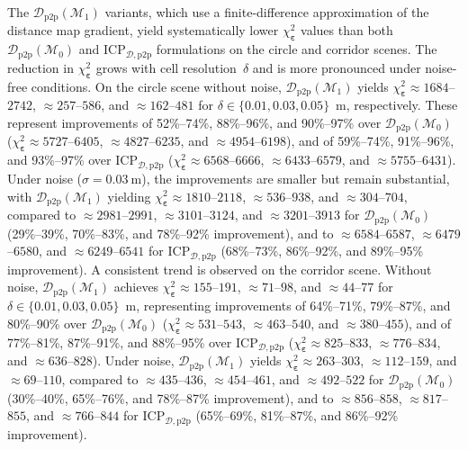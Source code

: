 The $\mathcal{D}_\mathrm{p2p}(\mathcal{M}_1)$ variants, which use a
finite-difference approximation of the distance map gradient, yield
systematically lower $\chi_{\boldsymbol{\varepsilon}}^2$ values than both
$\mathcal{D}_\mathrm{p2p}(\mathcal{M}_0)$ and
$\mathrm{ICP}_{\mathcal{D},\mathrm{p2p}}$ formulations on the circle and
corridor scenes. The reduction in $\chi_{\boldsymbol{\varepsilon}}^2$ grows
with cell resolution~$\delta$ and is more pronounced under noise-free
conditions. On the circle scene without noise,
$\mathcal{D}_\mathrm{p2p}(\mathcal{M}_1)$ yields
$\chi_{\boldsymbol{\varepsilon}}^2 \approx 1684$--$2742$,
$\approx 257$--$586$, and $\approx 162$--$481$ for
$\delta \in \{0.01, 0.03, 0.05\}$~m, respectively.
These represent improvements of 52\%--74\%, 88\%--96\%, and 90\%--97\% over
$\mathcal{D}_\mathrm{p2p}(\mathcal{M}_0)$
($\chi_{\boldsymbol{\varepsilon}}^2 \approx 5727$--$6405$,
$\approx 4827$--$6235$, and $\approx 4954$--$6198$), and of
59\%--74\%, 91\%--96\%, and 93\%--97\% over
$\mathrm{ICP}_{\mathcal{D},\mathrm{p2p}}$
($\chi_{\boldsymbol{\varepsilon}}^2 \approx 6568$--$6666$,
$\approx 6433$--$6579$, and $\approx 5755$--$6431$).
Under noise ($\sigma = \SI{0.03}{\metre}$), the improvements are smaller but
remain substantial, with
$\mathcal{D}_\mathrm{p2p}(\mathcal{M}_1)$ yielding
$\chi_{\boldsymbol{\varepsilon}}^2 \approx 1810$--$2118$,
$\approx 536$--$938$, and $\approx 304$--$704$, compared to
$\approx 2981$--$2991$, $\approx 3101$--$3124$, and $\approx 3201$--$3913$
for $\mathcal{D}_\mathrm{p2p}(\mathcal{M}_0)$
(29\%--39\%, 70\%--83\%, and 78\%--92\% improvement), and to
$\approx 6584$--$6587$, $\approx 6479$--$6580$, and $\approx 6249$--$6541$
for $\mathrm{ICP}_{\mathcal{D},\mathrm{p2p}}$
(68\%--73\%, 86\%--92\%, and 89\%--95\% improvement).
A consistent trend is observed on the corridor scene.
Without noise, $\mathcal{D}_\mathrm{p2p}(\mathcal{M}_1)$ achieves
$\chi_{\boldsymbol{\varepsilon}}^2 \approx 155$--$191$,
$\approx 71$--$98$, and $\approx 44$--$77$ for
$\delta \in \{0.01, 0.03, 0.05\}$~m, representing improvements of
64\%--71\%, 79\%--87\%, and 80\%--90\% over
$\mathcal{D}_\mathrm{p2p}(\mathcal{M}_0)$
($\chi_{\boldsymbol{\varepsilon}}^2 \approx 531$--$543$,
$\approx 463$--$540$, and $\approx 380$--$455$), and of
77\%--81\%, 87\%--91\%, and 88\%--95\% over
$\mathrm{ICP}_{\mathcal{D},\mathrm{p2p}}$
($\chi_{\boldsymbol{\varepsilon}}^2 \approx 825$--$833$,
$\approx 776$--$834$, and $\approx 636$--$828$).
Under noise, $\mathcal{D}_\mathrm{p2p}(\mathcal{M}_1)$ yields
$\chi_{\boldsymbol{\varepsilon}}^2 \approx 263$--$303$,
$\approx 112$--$159$, and $\approx 69$--$110$, compared to
$\approx 435$--$436$, $\approx 454$--$461$, and $\approx 492$--$522$
for $\mathcal{D}_\mathrm{p2p}(\mathcal{M}_0)$
(30\%--40\%, 65\%--76\%, and 78\%--87\% improvement), and to
$\approx 856$--$858$, $\approx 817$--$855$, and $\approx 766$--$844$
for $\mathrm{ICP}_{\mathcal{D},\mathrm{p2p}}$
(65\%--69\%, 81\%--87\%, and 86\%--92\% improvement).

